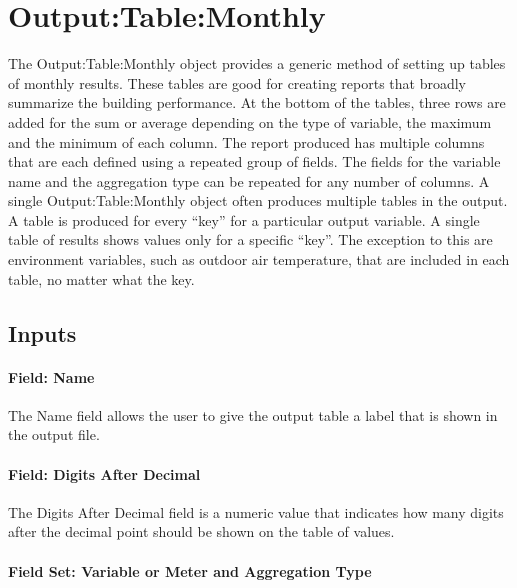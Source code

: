 \section{Output:Table:Monthly}\label{outputtablemonthly}

The Output:Table:Monthly object provides a generic method of setting up tables of monthly results. These tables are good for creating reports that broadly summarize the building performance. At the bottom of the tables, three rows are added for the sum or average depending on the type of variable, the maximum and the minimum of each column. The report produced has multiple columns that are each defined using a repeated group of fields. The fields for the variable name and the aggregation type can be repeated for any number of columns. A single Output:Table:Monthly object often produces multiple tables in the output. A table is produced for every ``key'' for a particular output variable. A single table of results shows values only for a specific ``key''. The exception to this are environment variables, such as outdoor air temperature, that are included in each table, no matter what the key.

\subsection{Inputs}\label{inputs-063}

\paragraph{Field: Name}\label{field-name-061}

The Name field allows the user to give the output table a label that is shown in the output file.

\paragraph{Field: Digits After Decimal}\label{field-digits-after-decimal}

The Digits After Decimal field is a numeric value that indicates how many digits after the decimal point should be shown on the table of values.

\paragraph{Field Set: Variable or Meter and Aggregation Type}\label{field-set-variable-or-meter-and-aggregation-type}

